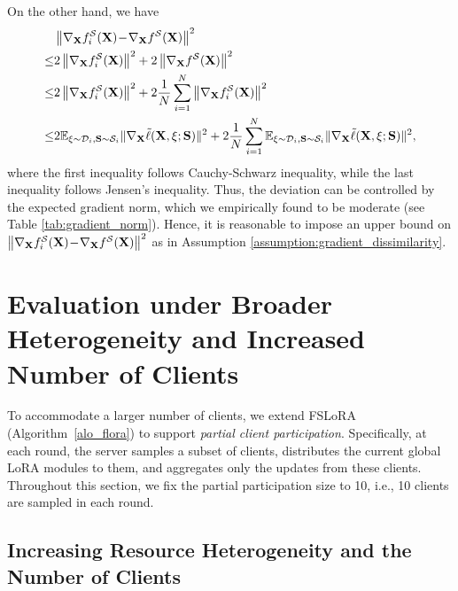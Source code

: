 \documentclass{article} %
\theoremstyle{plain}
\theoremstyle{definition}
\begin{document}
On the other hand, we have
\begin{equation}
\begin{aligned}
& \left\| \nabla_{\bf X} f_i^{\mathcal{S}}({\bf X}) \!-\! \nabla_{\bf X} f^{\mathcal{S}}(\bf X) \right\|^2 \\
\leq &  2 \left\| \nabla_{\bf X} f_i^{\mathcal{S}}({\bf X})  \right\|^2 +   2 \left\| \nabla_{\bf X} f^{\mathcal{S}}(\bf X) \right\|^2 \\
\leq & 2 \left\| \nabla_{\bf X} f_i^{\mathcal{S}}({\bf X})  \right\|^2 +   2 \frac{1}{N}\sum_{i=1}^N \left\| \nabla_{\bf X} f_i^{\mathcal{S}}({\bf X}) \right\|^2 \\
\leq & 2 \mathbb{E}_{\xi \sim \mathcal{D}_i, \mathbf{S}\sim \mathcal{S}_i}\|\nabla_{\mathbf{X}} \tilde{\ell}(\mathbf{X},\xi;\mathbf{S})\|^2 +   2 \frac{1}{N}\sum_{i=1}^N \mathbb{E}_{\xi \sim \mathcal{D}_i, \mathbf{S}\sim \mathcal{S}_i}\|\nabla_{\mathbf{X}} \tilde{\ell}(\mathbf{X},\xi;\mathbf{S})\|^2,
\end{aligned}
\end{equation}
where the first inequality follows Cauchy-Schwarz inequality, while the last inequality follows Jensen's inequality.
Thus, the deviation can be controlled by the expected gradient norm, which we empirically found to be moderate (see Table \ref{tab:gradient_norm}). Hence, it is reasonable to impose an upper bound on $\left\| \nabla_{\bf X} f_i^{\mathcal{S}}({\bf X}) \!-\! \nabla_{\bf X} f^{\mathcal{S}}(\bf X) \right\|^2 $ as in Assumption \ref{assumption:gradient_dissimilarity}.


\section{Evaluation under Broader Heterogeneity and Increased Number of Clients}\label{appen:broader_heterogeneity}

To accommodate a larger number of clients, we extend FSLoRA (Algorithm~\ref{alo_flora}) to support \emph{partial client participation}. Specifically, at each round, the server samples a subset of clients, distributes the current global LoRA modules to them, and aggregates only the updates from these clients. Throughout this section, we fix the partial participation size to 10, i.e., 10 clients are sampled in each round.

\subsection{Increasing Resource Heterogeneity and the Number of Clients}\label{appen:more_devices_more_heterogeneity}
\end{document}
